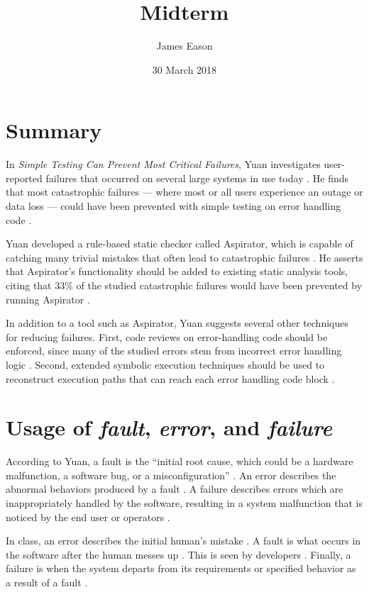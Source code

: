 \documentclass[11pt]{article}
\title{Midterm}
\author{James Eason}
\date{30 March 2018}
\begin{document}
\maketitle

\thispagestyle{empty}

\doublespacing

\section{Summary}

In \textit{Simple Testing Can Prevent Most Critical Failures}, Yuan investigates user-reported failures that occurred on several large systems in use today \cite{yuan2014}. He finds that most catastrophic failures --- where most or all users experience an outage or data loss --- could have been prevented with simple testing on error handling code \cite{yuan2014}. 

Yuan developed a rule-based static checker called Aspirator, which is capable of catching many trivial mistakes that often lead to catastrophic failures \cite{yuan2014}. He asserts that Aspirator's functionality should be added to existing static analysis tools, citing that 33\% of the studied catastrophic failures would have been prevented by running Aspirator \cite{yuan2014}.

In addition to a tool such as Aspirator, Yuan suggests several other techniques for reducing failures. First, code reviews on error-handling code should be enforced, since many of the studied errors stem from incorrect error handling logic \cite{yuan2014}. Second, extended symbolic execution techniques should be used to reconstruct execution paths that can reach each error handling code block \cite{yuan2014}. 


\section{Usage of \textit{fault}, \textit{error}, and \textit{failure}}

According to Yuan, a fault is the ``initial root cause, which could be a hardware malfunction, a software bug, or a misconfiguration'' \cite{yuan2014}. An error describes the abnormal behaviors produced by a fault \cite{yuan2014}. A failure describes errors which are inappropriately handled by the software, resulting in a system malfunction that is noticed by the end user or operators \cite{yuan2014}.

In class, an error describes the initial human’s mistake \cite{beck118}. A fault is what occurs in the software after the human messes up \cite{beck118}. This is seen by developers \cite{beck118}. Finally, a failure is when the system departs from its requirements or specified behavior as a result of a fault \cite{beck118}.
\end{document}
